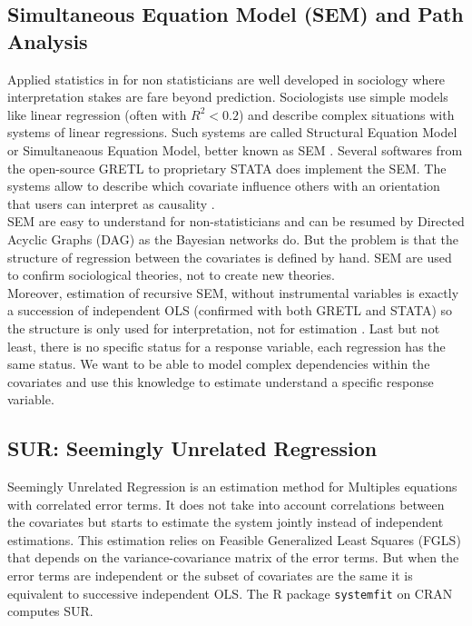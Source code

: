 \documentclass[12pt,a4paper]{report}
\begin{document}
		\subsection{Simultaneous Equation Model (SEM) and Path Analysis}		%
		Applied statistics in for non statisticians are well developed in sociology where interpretation  stakes are fare beyond prediction. Sociologists use simple models like linear regression (often with $R^2<0.2$) and describe complex situations with systems of linear regressions. Such systems are called Structural Equation Model or Simultaneaous Equation Model, better known as SEM \cite{davidson1993estimation}. Several softwares from the open-source GRETL \cite{CottrellLucchetti2007gretlmanual} to proprietary STATA does implement the SEM. The systems allow to describe which covariate influence others with an orientation that users can interpret as causality \cite{pearl2000causality,pearl1998graphs}. \\
		SEM are easy to understand for non-statisticians and can be resumed by Directed Acyclic Graphs (DAG) as the Bayesian networks do. But the problem is that the structure of regression between the covariates is defined by hand. SEM are used to confirm sociological theories, not to create new theories. \\
		Moreover, estimation of recursive SEM, without instrumental variables is exactly a succession of independent OLS (confirmed with both GRETL and STATA) so the structure is only used for interpretation, not for estimation \cite{brito2006graphical}. Last but not least, there is no specific status for a response variable, each regression has the same status. We want to be able to model complex dependencies within the covariates and use this knowledge to estimate understand a specific response variable.
		\subsection{SUR: Seemingly Unrelated Regression}		%
		Seemingly Unrelated Regression \cite{SURzellner} is an estimation method for Multiples equations with correlated error terms. It does not take into account correlations between the covariates but starts to estimate the system jointly instead of independent estimations. This estimation relies on Feasible Generalized Least Squares (FGLS) that depends on the variance-covariance matrix of the error terms. But when the error terms are independent or the subset of covariates are the same it is equivalent to successive independent OLS. The R package {\tt systemfit} on CRAN computes SUR. 
			
\end{document}
